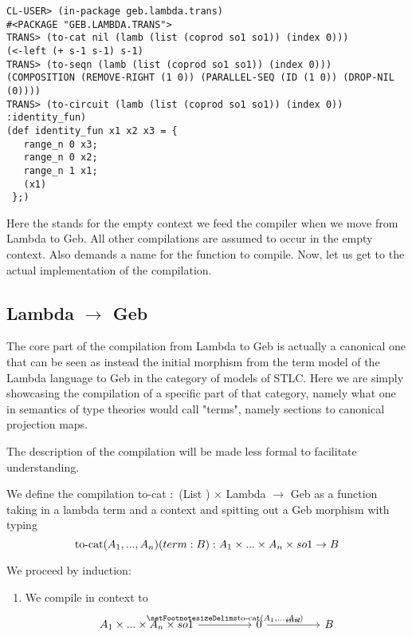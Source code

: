 \begin{verbatim}
CL-USER> (in-package geb.lambda.trans)
#<PACKAGE "GEB.LAMBDA.TRANS">
TRANS> (to-cat nil (lamb (list (coprod so1 so1)) (index 0)))
(<-left (+ s-1 s-1) s-1)
TRANS> (to-seqn (lamb (list (coprod so1 so1)) (index 0)))
(COMPOSITION (REMOVE-RIGHT (1 0)) (PARALLEL-SEQ (ID (1 0)) (DROP-NIL (0))))
TRANS> (to-circuit (lamb (list (coprod so1 so1)) (index 0)) :identity_fun)
(def identity_fun x1 x2 x3 = {
   range_n 0 x3;
   range_n 0 x2;
   range_n 1 x1;
   (x1)
 };)

\end{verbatim}

Here the  stands for the empty context we feed the compiler when we move from Lambda to Geb. All other compilations are assumed to occur in the empty context. Also  demands a name for the function to compile. Now, let us get to the actual implementation of the compilation.

\subsection{Lambda $\to$ Geb}
The core part of the compilation from Lambda to Geb is actually a canonical one that can be seen as instead the initial morphism from the term model of the Lambda language to Geb in the category of models of STLC. Here we are simply showcasing the compilation of a specific part of that category, namely what one in semantics of type theories would call "terms", namely sections to canonical projection maps.

The description of the compilation will be made less formal to facilitate understanding.

 We define the compilation to-cat $\colon$ (List \gebobj) $\times$ Lambda $\to$ Geb as a function taking in a lambda term and a context and spitting out a Geb morphism with typing $$\textnormal{to-cat} (A_1,...,A_n) (term : B) : A_1 \times ...\times A_n \times so1 \to B $$

 We proceed by induction:

\begin{enumerate}
    \item We compile  in context  to
\[\begin{tikzcd}
	{A_1\times...\times A_n \times so1} && 0 && B
	\arrow["{\footnotesize{\textnormal{to-cat} (A_1,...,A_n)}}", from=1-1, to=1-3]
	\arrow["init", from=1-3, to=1-5]
\end{tikzcd}\]
\end{enumerate}

